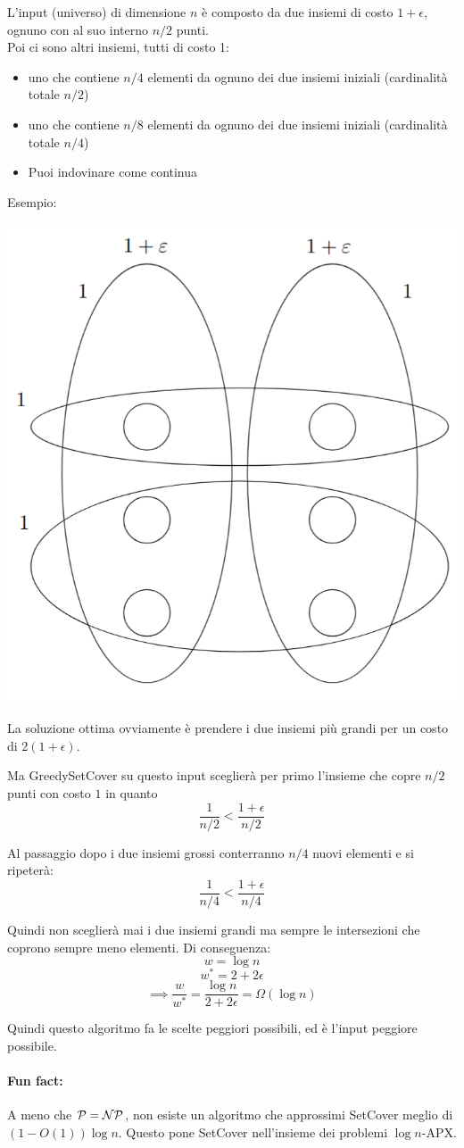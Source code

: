 L'input (universo) di dimensione $n$ è composto da due insiemi di costo $1 + \epsilon$, ognuno con al suo interno $n/2$ punti. \\
Poi ci sono altri insiemi, tutti di costo 1:
\begin{itemize}
	\item uno che contiene $n/4$ elementi da ognuno dei due insiemi iniziali (cardinalità totale $n/2$)
	\item uno che contiene $n/8$ elementi da ognuno dei due insiemi iniziali (cardinalità totale $n/4$)
	\item Puoi indovinare come continua
\end{itemize}
Esempio:

\begin{center}
	\includegraphics[width=0.5\columnwidth]{img/VertexCoverInput}
\end{center}

La soluzione ottima ovviamente è prendere i due insiemi più grandi per un costo di $2(1 + \epsilon)$.\\

\newpage

Ma GreedySetCover su questo input sceglierà per primo l'insieme che copre $n/2$ punti con costo $1$ in quanto 
$$ \frac{1}{n/2} < \frac{1+\epsilon}{n/2} $$

Al passaggio dopo i due insiemi grossi conterranno $n/4$ nuovi elementi e si ripeterà:
$$ \frac{1}{n/4} < \frac{1+\epsilon}{n/4} $$

Quindi non sceglierà mai i due insiemi grandi ma sempre le intersezioni che coprono sempre meno elementi. Di conseguenza:
$$ w = \log n $$
$$ w^\ast = 2 + 2 \epsilon$$
$$ \implies \frac{w}{w^\ast} = \frac{\log n}{2 + 2 \epsilon} = \Omega (\log n)$$

Quindi questo algoritmo fa le scelte peggiori possibili, ed è l'input peggiore possibile.\\

\paragraph{Fun fact:} A meno che $\mathcal{P} = \mathcal{NP}$, non esiste un algoritmo che approssimi SetCover meglio di $(1 - O(1)) \log n$. Questo pone SetCover nell'insieme dei problemi $\log n$-APX.\\

\newpage